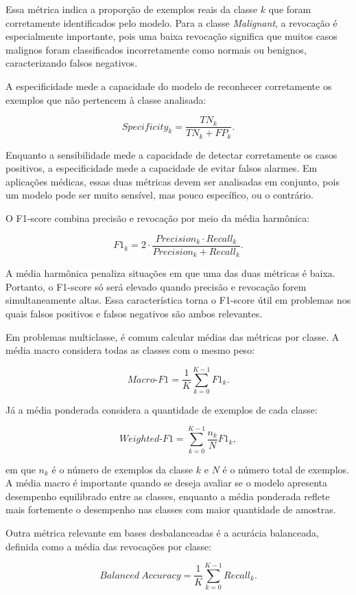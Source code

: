 \documentclass[
    12pt,
    openright,
    oneside,
    a4paper,
    english,
    brazil
]{abntex2}
\begin{document}
Essa métrica indica a proporção de exemplos reais da classe \(k\) que foram corretamente identificados pelo modelo. Para a classe \textit{Malignant}, a revocação é especialmente importante, pois uma baixa revocação significa que muitos casos malignos foram classificados incorretamente como normais ou benignos, caracterizando falsos negativos.

A especificidade mede a capacidade do modelo de reconhecer corretamente os exemplos que não pertencem à classe analisada:

\[
Specificity_k =
\frac{TN_k}{TN_k + FP_k}.
\]

Enquanto a sensibilidade mede a capacidade de detectar corretamente os casos positivos, a especificidade mede a capacidade de evitar falsos alarmes. Em aplicações médicas, essas duas métricas devem ser analisadas em conjunto, pois um modelo pode ser muito sensível, mas pouco específico, ou o contrário.

O F1-score combina precisão e revocação por meio da média harmônica:

\[
F1_k =
2 \cdot
\frac{Precision_k \cdot Recall_k}
{Precision_k + Recall_k}.
\]

A média harmônica penaliza situações em que uma das duas métricas é baixa. Portanto, o F1-score só será elevado quando precisão e revocação forem simultaneamente altas. Essa característica torna o F1-score útil em problemas nos quais falsos positivos e falsos negativos são ambos relevantes.

Em problemas multiclasse, é comum calcular médias das métricas por classe. A média macro considera todas as classes com o mesmo peso:

\[
Macro\text{-}F1 =
\frac{1}{K}
\sum_{k=0}^{K-1}
F1_k.
\]

Já a média ponderada considera a quantidade de exemplos de cada classe:

\[
Weighted\text{-}F1 =
\sum_{k=0}^{K-1}
\frac{n_k}{N}
F1_k,
\]

em que \(n_k\) é o número de exemplos da classe \(k\) e \(N\) é o número total de exemplos. A média macro é importante quando se deseja avaliar se o modelo apresenta desempenho equilibrado entre as classes, enquanto a média ponderada reflete mais fortemente o desempenho nas classes com maior quantidade de amostras.

Outra métrica relevante em bases desbalanceadas é a acurácia balanceada, definida como a média das revocações por classe:

\[
Balanced\ Accuracy =
\frac{1}{K}
\sum_{k=0}^{K-1}
Recall_k.
\]
\end{document}
